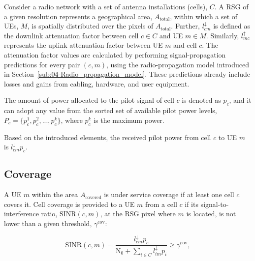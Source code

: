 Consider a radio network with a set of antenna installations (cells),
$C$.
A RSG of a given resolution represents a geographical area, $A_{\mathrm{total}}$,
within which a set of UEs, $M$,
is spatially distributed over the pixels of $A_{\mathrm{total}}$.
Further, $l_{cm}^{\downarrow}$
is defined as the downlink attenuation factor between cell $c\in C$
and UE $m\in M$. Similarly, $l_{mc}^{\uparrow}$
represents the uplink attenuation factor between UE $m$ and cell
$c$. The attenuation factor values are calculated by performing signal-propagation
predictions for every pair $(c,m)$, using the radio-propagation model
introduced in Section~\ref{sub:04-Radio_propagation_model}. These
predictions already include losses and gains from cabling, hardware,
and user equipment.

The amount of power allocated to the pilot signal of cell $c$ is
denoted as $p_{c}$,
and it can adopt any value from the sorted set of available pilot
power levels, $P_{c}=\{p_{c}^{1},p_{c}^{2},...,p_{c}^{k}\}$,
where $p_{c}^{k}$ is the maximum power.

Based on the introduced elements, the received pilot power from cell
$c$ to UE $m$ is $l_{cm}^{\downarrow}p_{c}$.


\subsection{Coverage}

A UE $m$ within the area $A_{\mathrm{covered}}$ is under service
coverage if at least one cell $c$ covers it. Cell coverage is provided
to a UE $m$ from a cell $c$ if its signal-to-interference ratio,
$\mathrm{SINR}(c,m)$,
at the RSG pixel where $m$ is located, is not lower than a given
threshold, $\gamma^{\mathrm{cov}}$:

\begin{equation}
\mathrm{SINR}(c,m)=\frac{l_{cm}^{\downarrow}p_{c}}{\mathrm{N}_{0}+\sum_{i\in C}l_{im}^{\downarrow}p_{i}}\ge\gamma^{\mathrm{cov}},\label{eq:06-Signal_to_interference_ratio}
\end{equation}


